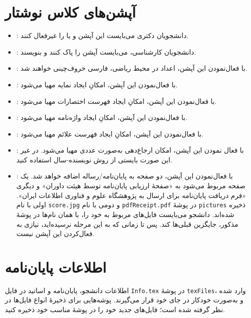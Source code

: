 \section{آپشن‌های کلاس نوشتار}
\begin{itemize}
	\item{}:
	دانشجویان دکتری می‌بایست این آپشن و یا
	را غیرفعال کنند.
	\item{}:
	دانشجویان کارشناسی، می‌بایست آپشن
	را پاک کنند و
	بنویسند.
	\item{}:
	با فعال‌نمودن این آپشن، اعداد در محیط ریاضی، فارسی حروف‌چینی خواهند شد.
	\item{}:
	با فعال‌نمودن این آپشن، امکانِ ایجاد نمایه مهیا می‌شود.
	\item{}:
	با فعال‌نمودن این آپشن، امکانِ ایجاد فهرست اختصارات مهیا می‌شود.
	\item{}:
	با فعال‌نمودن این آپشن، امکانِ ایجاد واژه‌نامه مهیا می‌شود.
	\item{}:
	با فعال‌نمودن این آپشن، امکانِ ایجاد فهرست علائم مهیا می‌شود.
	\item{}:
	با فعال نمودن این آپشن، امکان ارجاع‌دهی به‌صورت عددی مهیا می‌شود. در غیر این صورت
	بایستی از روش نویسنده-سال استفاده کنید.
	\item{}:
	با فعال‌نمودن این آپشن، دو صفحه به پایان‌نامه/رساله اضافه خواهد شد.
	یک صفحه مربوط می‌شود به «صفحهٔ ارزیابی پایان‌نامه توسط هیئت داوران» و دیگری
	«فرم دریافت پایان‌نامه برای ارسال به پژوهشگاه علوم و فناوری اطلاعات ایران».
	اولی با نام
	\verb|score.jpg|
	و دومی با نام
	\verb|pdfReceipt.pdf|
	در پوشهٔ
	\verb|pictures|
	ذخیره شده‌اند. دانشجو می‌بایست فایل‌های مربوط به خود را، با همان نام‌ها در پوشهٔ
	مذکور، جایگزین قبلی‌ها کند. پس تا زمانی که به این مرحله نرسیده‌اید، نیازی به فعال‌کردن
	این آپشن نیست.
\end{itemize}

\section{اطلاعات پایان‌نامه}
اطلاعات دانشجو، پایان‌نامه و اساتید در فایل
\verb|Info.tex|
در پوشهٔ
\verb|texFiles|،
وارد شده و به‌صورت خودکار در جای خود قرار می‌گیرند. پوشه‌هایی برای ذخیرهٔ انواع فایل‌ها
در نظر گرفته شده است؛ فایل‌های جدید خود را در پوشهٔ مناسب خود ذخیره کنید.


